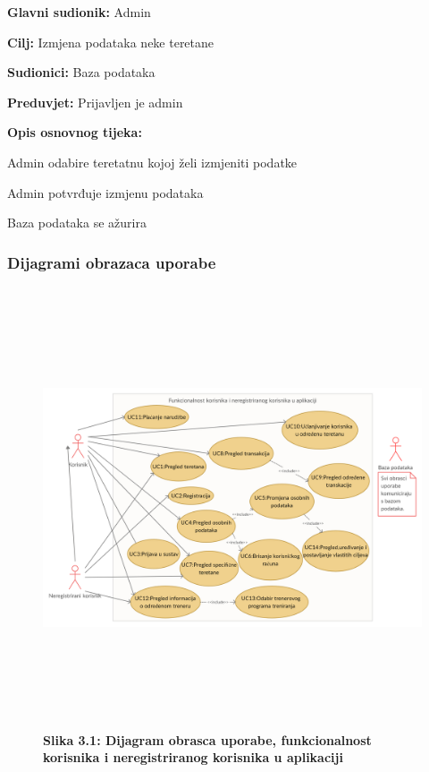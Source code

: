 					\noindent {}
					\begin{packed_item}
	
						\item \textbf{Glavni sudionik: } Admin
						\item  \textbf{Cilj:} Izmjena podataka neke teretane 
						\item  \textbf{Sudionici:} Baza podataka
						\item  \textbf{Preduvjet:} Prijavljen je admin
						\item  \textbf{Opis osnovnog tijeka:}
						
						\item[] \begin{packed_enum}
	
							\item Admin odabire teretatnu kojoj želi izmjeniti podatke
							\item Admin potvrđuje izmjenu podataka
							\item Baza podataka se ažurira
						\end{packed_enum}
						
	
					\end{packed_item}
				
					
				\subsubsection{Dijagrami obrazaca uporabe}
				\begin{figure}
				\includegraphics[height= 13cm,width=1.2\textwidth]{slike/obrazac1.jpg}
				\textbf{Slika 3.1: Dijagram obrasca uporabe, funkcionalnost korisnika i neregistriranog korisnika u aplikaciji  }
				
				\end{figure}
				
